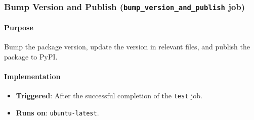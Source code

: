 \subsubsection{Bump Version and Publish (\texttt{bump\_version\_and\_publish} job)}

\paragraph{Purpose}
Bump the package version, update the version in relevant files, and publish the package to PyPI.

\paragraph{Implementation}
\begin{itemize}
    \item \textbf{Triggered}: After the successful completion of the \texttt{test} job.
    \item \textbf{Runs on}: \texttt{ubuntu-latest}.
\end{itemize}

